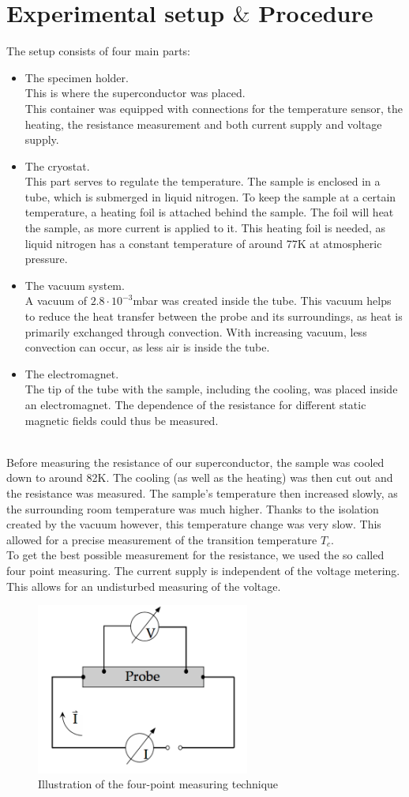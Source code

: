 \documentclass[10pt]{article}
\begin{document}
\section{Experimental setup $\&$ Procedure}
The setup consists of four main parts:\\
\begin{itemize}
\item The specimen holder.\\
 This is where the superconductor was placed.\\ This container was equipped with connections for the temperature sensor, the heating, the resistance measurement and both current supply and voltage supply.\\
\item The cryostat.\\
This part serves to regulate the temperature. The sample is enclosed in a tube, which is submerged in liquid nitrogen. To keep the sample at a certain temperature, a heating foil is attached behind the sample. The foil will heat the sample, as more current is applied to it. This heating foil is needed, as liquid nitrogen has a constant temperature of around 77K at atmospheric pressure. \\
\item The vacuum system.\\
A vacuum of $2.8 \cdot 10^{-3}$mbar was created inside the tube. This vacuum helps to reduce the heat transfer between the probe and its surroundings, as heat is primarily exchanged through convection. With increasing vacuum, less convection can occur, as less air is inside the tube. 
\item The electromagnet.\\
The tip of the tube with the sample, including the cooling, was placed inside an electromagnet. The dependence of the resistance for different static magnetic fields could thus be measured.
\end{itemize}

~\\
  
Before measuring the resistance of our superconductor, the sample was cooled down to around 82K. The cooling (as well as the heating) was then cut out and the resistance was measured. The sample's temperature then increased slowly, as the surrounding room temperature was much higher. Thanks to the isolation created by the vacuum however, this temperature change was very slow. This allowed for a precise measurement of the transition temperature $T_c$.\\
To get the best possible measurement for the resistance, we used the so called four point measuring. The current supply is independent of the voltage metering. This allows for an undisturbed measuring of the voltage. 

\begin{figure}[H]
\centering
\includegraphics[width=7cm]{vierpunkt.png}
\caption{Illustration of the four-point measuring technique}
\end{figure}
\end{document}
